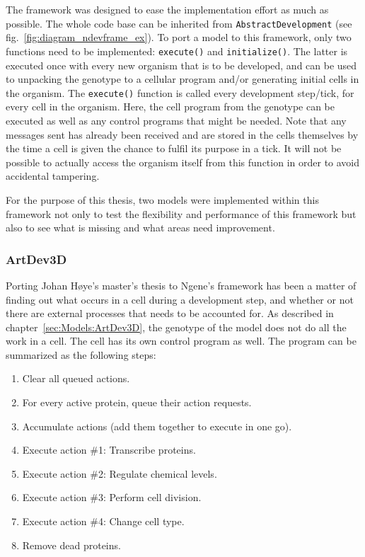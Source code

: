 The framework was designed to ease the implementation effort as much as possible. The whole code base can be inherited from \texttt{AbstractDevelopment} (see fig.~\ref{fig:diagram_ndevframe_ex}). To port a model to this framework, only two functions need to be implemented: \texttt{execute()} and \texttt{initialize()}. The latter is executed once with every new organism that is to be developed, and can be used to unpacking the genotype to a cellular program and/or generating initial cells in the organism. The \texttt{execute()} function is called every development step/tick, for every cell in the organism. Here, the cell program from the genotype can be executed as well as any control programs that might be needed. Note that any messages sent has already been received and are stored in the cells themselves by the time a cell is given the chance to fulfil its purpose in a tick. It will not be possible to actually access the organism itself from this function in order to avoid accidental tampering.

For the purpose of this thesis, two models were implemented within this framework not only to test the flexibility and performance of this framework but also to see what is missing and what areas need improvement.

\subsubsection{ArtDev3D}
\label{sec:Implementation:ArtDev3D}
Porting Johan H{\o}ye's master's thesis\cite{hoye2006} to Ngene's framework has been a matter of finding out what occurs in a cell during a development step, and whether or not there are external processes that needs to be accounted for. As described in chapter~\ref{sec:Models:ArtDev3D}, the genotype of the model does not do all the work in a cell. The cell has its own control program as well. The program can be summarized as the following steps:

\begin{enumerate}
	\itemsep=0pt
	\item Clear all queued actions.
	\item For every active protein, queue their action requests.
	\item Accumulate actions (add them together to execute in one go).
	\item Execute action \#1: Transcribe proteins.
	\item Execute action \#2: Regulate chemical levels.
	\item Execute action \#3: Perform cell division.
	\item Execute action \#4: Change cell type.
	\item Remove dead proteins.
\end{enumerate}

